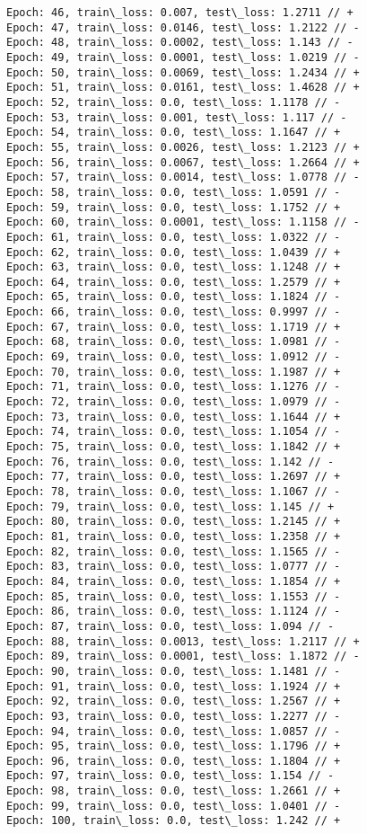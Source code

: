 \documentclass[11pt]{article}
\begin{document}
\begin{Verbatim}[commandchars=\\\{\}]
Epoch: 46, train\_loss: 0.007, test\_loss: 1.2711 // +
Epoch: 47, train\_loss: 0.0146, test\_loss: 1.2122 // -
Epoch: 48, train\_loss: 0.0002, test\_loss: 1.143 // -
Epoch: 49, train\_loss: 0.0001, test\_loss: 1.0219 // -
Epoch: 50, train\_loss: 0.0069, test\_loss: 1.2434 // +
Epoch: 51, train\_loss: 0.0161, test\_loss: 1.4628 // +
Epoch: 52, train\_loss: 0.0, test\_loss: 1.1178 // -
Epoch: 53, train\_loss: 0.001, test\_loss: 1.117 // -
Epoch: 54, train\_loss: 0.0, test\_loss: 1.1647 // +
Epoch: 55, train\_loss: 0.0026, test\_loss: 1.2123 // +
Epoch: 56, train\_loss: 0.0067, test\_loss: 1.2664 // +
Epoch: 57, train\_loss: 0.0014, test\_loss: 1.0778 // -
Epoch: 58, train\_loss: 0.0, test\_loss: 1.0591 // -
Epoch: 59, train\_loss: 0.0, test\_loss: 1.1752 // +
Epoch: 60, train\_loss: 0.0001, test\_loss: 1.1158 // -
Epoch: 61, train\_loss: 0.0, test\_loss: 1.0322 // -
Epoch: 62, train\_loss: 0.0, test\_loss: 1.0439 // +
Epoch: 63, train\_loss: 0.0, test\_loss: 1.1248 // +
Epoch: 64, train\_loss: 0.0, test\_loss: 1.2579 // +
Epoch: 65, train\_loss: 0.0, test\_loss: 1.1824 // -
Epoch: 66, train\_loss: 0.0, test\_loss: 0.9997 // -
Epoch: 67, train\_loss: 0.0, test\_loss: 1.1719 // +
Epoch: 68, train\_loss: 0.0, test\_loss: 1.0981 // -
Epoch: 69, train\_loss: 0.0, test\_loss: 1.0912 // -
Epoch: 70, train\_loss: 0.0, test\_loss: 1.1987 // +
Epoch: 71, train\_loss: 0.0, test\_loss: 1.1276 // -
Epoch: 72, train\_loss: 0.0, test\_loss: 1.0979 // -
Epoch: 73, train\_loss: 0.0, test\_loss: 1.1644 // +
Epoch: 74, train\_loss: 0.0, test\_loss: 1.1054 // -
Epoch: 75, train\_loss: 0.0, test\_loss: 1.1842 // +
Epoch: 76, train\_loss: 0.0, test\_loss: 1.142 // -
Epoch: 77, train\_loss: 0.0, test\_loss: 1.2697 // +
Epoch: 78, train\_loss: 0.0, test\_loss: 1.1067 // -
Epoch: 79, train\_loss: 0.0, test\_loss: 1.145 // +
Epoch: 80, train\_loss: 0.0, test\_loss: 1.2145 // +
Epoch: 81, train\_loss: 0.0, test\_loss: 1.2358 // +
Epoch: 82, train\_loss: 0.0, test\_loss: 1.1565 // -
Epoch: 83, train\_loss: 0.0, test\_loss: 1.0777 // -
Epoch: 84, train\_loss: 0.0, test\_loss: 1.1854 // +
Epoch: 85, train\_loss: 0.0, test\_loss: 1.1553 // -
Epoch: 86, train\_loss: 0.0, test\_loss: 1.1124 // -
Epoch: 87, train\_loss: 0.0, test\_loss: 1.094 // -
Epoch: 88, train\_loss: 0.0013, test\_loss: 1.2117 // +
Epoch: 89, train\_loss: 0.0001, test\_loss: 1.1872 // -
Epoch: 90, train\_loss: 0.0, test\_loss: 1.1481 // -
Epoch: 91, train\_loss: 0.0, test\_loss: 1.1924 // +
Epoch: 92, train\_loss: 0.0, test\_loss: 1.2567 // +
Epoch: 93, train\_loss: 0.0, test\_loss: 1.2277 // -
Epoch: 94, train\_loss: 0.0, test\_loss: 1.0857 // -
Epoch: 95, train\_loss: 0.0, test\_loss: 1.1796 // +
Epoch: 96, train\_loss: 0.0, test\_loss: 1.1804 // +
Epoch: 97, train\_loss: 0.0, test\_loss: 1.154 // -
Epoch: 98, train\_loss: 0.0, test\_loss: 1.2661 // +
Epoch: 99, train\_loss: 0.0, test\_loss: 1.0401 // -
Epoch: 100, train\_loss: 0.0, test\_loss: 1.242 // +

    \end{Verbatim}
\end{document}
